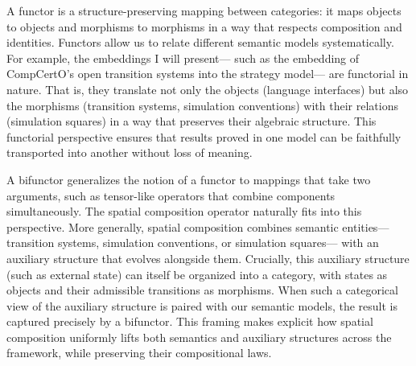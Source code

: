 A functor is a structure-preserving mapping
between categories:
it maps objects to objects and morphisms to morphisms
in a way that respects composition and identities.
Functors allow us to relate different semantic models systematically.
For example,
the embeddings I will present---%
such as the embedding of CompCertO's open transition systems
into the strategy model---%
are functorial in nature.
That is,
they translate not only the objects (language interfaces)
but also the morphisms (transition systems, simulation conventions)
with their relations (simulation squares)
in a way that preserves their algebraic structure.
This functorial perspective ensures that
results proved in one model can be
faithfully transported into another without loss of meaning.

A bifunctor generalizes the notion of a functor
to mappings that take two arguments,
such as tensor-like operators
that combine components simultaneously.
The spatial composition operator naturally
fits into this perspective.
More generally,
spatial composition combines semantic entities---%
transition systems, simulation conventions,
or simulation squares---%
with an auxiliary structure that evolves alongside them.
Crucially, this
auxiliary structure (such as external state)
can itself be organized into a category,
with states as objects
and their admissible transitions as morphisms.
When such a categorical view of the auxiliary structure
is paired with our semantic models,
the result is captured precisely by a bifunctor.
This framing makes explicit
how spatial composition uniformly lifts
both semantics and auxiliary structures
across the framework,
while preserving their compositional laws.
